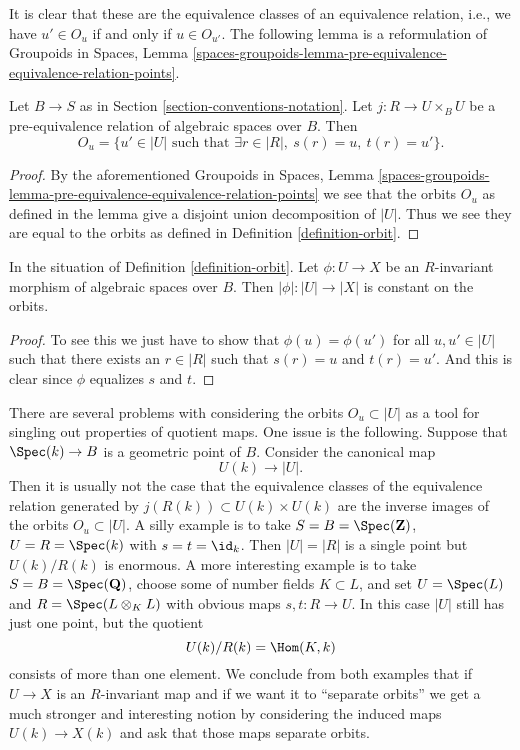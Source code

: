 \noindent
It is clear that these are the equivalence classes of an equivalence relation,
i.e., we have $u' \in O_u$ if and only if $u \in O_{u'}$. The following lemma
is a reformulation of
Groupoids in Spaces,
Lemma \ref{spaces-groupoids-lemma-pre-equivalence-equivalence-relation-points}.

\begin{lemma}
\label{lemma-pre-equivalence-equivalence-relation-points}
Let $B \to S$ as in Section \ref{section-conventions-notation}.
Let $j : R \to U \times_B U$ be a pre-equivalence relation
of algebraic spaces over $B$. Then
$$
O_u =
\{u' \in |U| \text{ such that } \exists r \in |R|, \ s(r) = u, \ t(r) = u'\}.
$$
\end{lemma}

\begin{proof}
By the aforementioned
Groupoids in Spaces,
Lemma \ref{spaces-groupoids-lemma-pre-equivalence-equivalence-relation-points}
we see that the orbits $O_u$ as defined in the lemma give a disjoint
union decomposition of $|U|$. Thus we see they are equal to the
orbits as defined in Definition \ref{definition-orbit}.
\end{proof}

\begin{lemma}
\label{lemma-invariant-map-constant-on-orbit}
In the situation of Definition \ref{definition-orbit}.
Let $\phi : U \to X$ be an $R$-invariant morphism of algebraic spaces over
$B$. Then $|\phi| : |U| \to |X|$ is constant on the orbits.
\end{lemma}

\begin{proof}
To see this we just have to show that $\phi(u) = \phi(u')$
for all $u, u' \in |U|$ such that
there exists an $r \in |R|$ such that $s(r) = u$ and $t(r) = u'$.
And this is clear since $\phi$ equalizes $s$ and $t$.
\end{proof}

\noindent
There are several problems with considering the orbits $O_u \subset |U|$
as a tool for singling out properties of quotient maps. One issue is the
following. Suppose that $\Spec(k) \to B$
is a geometric point of $B$. Consider the canonical map
$$
U(k) \longrightarrow |U|.
$$
Then it is usually not the case that the equivalence classes
of the equivalence relation generated by $j(R(k)) \subset U(k) \times U(k)$
are the inverse images of the orbits $O_u \subset |U|$.
A silly example is to take $S = B = \Spec(\mathbf{Z})$,
$U = R = \Spec(k)$ with $s = t = \id_k$. Then $|U| = |R|$ is
a single point but $U(k)/R(k)$ is enormous.
A more interesting example is to take $S = B = \Spec(\mathbf{Q})$,
choose some of number fields $K \subset L$, and set $U = \Spec(L)$
and $R = \Spec(L \otimes_K L)$ with obvious maps $s, t : R \to U$.
In this case $|U|$ still has just one point, but the quotient
$$
U(k)/R(k) = \Hom(K, k)
$$
consists of more than one element. We conclude from both examples
that if $U \to X$ is an $R$-invariant map and if we want it to
``separate orbits'' we get a much stronger and interesting notion by
considering the induced maps $U(k) \to X(k)$ and ask that
those maps separate orbits.

